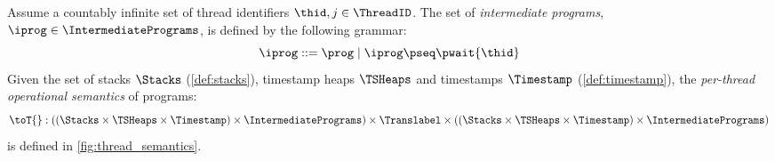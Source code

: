 \begin{defn}
Assume a countably infinite set of thread identifiers $\thid,j \in \ThreadID$.
The set of \emph{intermediate programs}, $\iprog \in \IntermediatePrograms$, is defined by the following grammar:
%
\[
    \iprog ::= \prog \mid \iprog \pseq \pwait{\thid}
\]
%
Given the set of stacks $\Stacks$ (\ref{def:stacks}), timestamp heaps $\TSHeaps$ and timestamps $\Timestamp$ (\ref{def:timestamp}), the \emph{per-thread operational semantics} of programs:
%
\[
	\toT{} : 
	\left((\Stacks \times \TSHeaps \times \Timestamp) \times \IntermediatePrograms \right) 
	\times \Translabel \times  
	\left((\Stacks \times \TSHeaps \times \Timestamp) \times \IntermediatePrograms \right) 
\]
%
is defined in \fig\ref{fig:thread_semantics}.
\end{defn}



